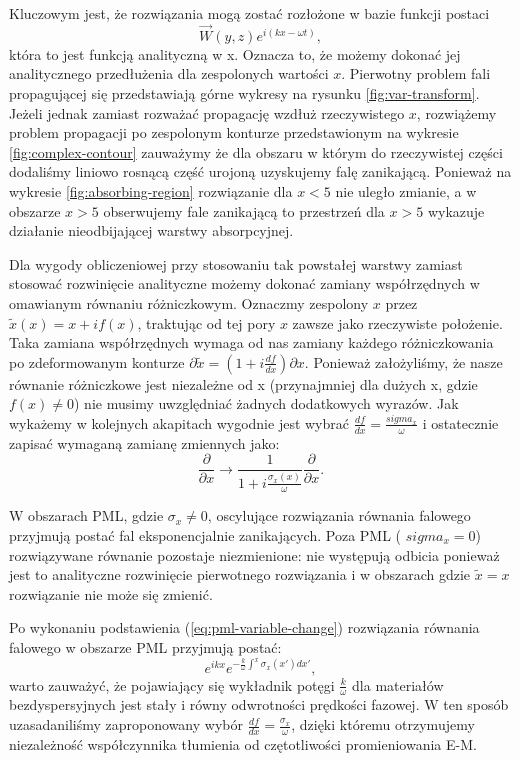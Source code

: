 Kluczowym jest, że rozwiązania mogą zostać rozłożone w bazie funkcji postaci
\begin{equation}
\vec{W}(y,z)e^{i(kx-\omega t)},
\end{equation}
która to jest funkcją analityczną w x. Oznacza to, że możemy dokonać jej analitycznego przedłużenia dla zespolonych wartości $x$. Pierwotny problem fali propagującej się przedstawiają górne wykresy na rysunku \ref{fig:var-transform}. Jeżeli jednak zamiast rozważać propagację wzdłuż rzeczywistego $x$, rozwiążemy problem propagacji po zespolonym konturze przedstawionym na wykresie \ref{fig:complex-contour} zauważymy że dla obszaru w którym do rzeczywistej części dodaliśmy liniowo rosnącą część urojoną uzyskujemy falę zanikającą. Ponieważ na wykresie \ref{fig:absorbing-region} rozwiązanie dla $x<5$ nie uległo zmianie, a w obszarze $x>5$ obserwujemy fale zanikającą to przestrzeń dla $x>5$ wykazuje działanie nieodbijającej warstwy absorpcyjnej.

Dla wygody obliczeniowej przy stosowaniu tak powstałej warstwy zamiast stosować rozwinięcie analityczne możemy dokonać zamiany współrzędnych w omawianym równaniu różniczkowym. Oznaczmy zespolony $x$ przez $\tilde{x}(x)=x+if(x)$, traktując od tej pory $x$ zawsze jako rzeczywiste położenie. Taka zamiana współrzędnych wymaga od nas zamiany każdego różniczkowania po zdeformowanym konturze $\partial \tilde{x} = (1+i\frac{df}{dx}) \partial x$. Ponieważ założyliśmy, że nasze równanie różniczkowe jest niezależne od x (przynajmniej dla dużych x, gdzie $f(x)\ne0$) nie musimy uwzględniać żadnych dodatkowych wyrazów. Jak wykażemy w kolejnych akapitach wygodnie jest wybrać $\frac{df}{dx}=\frac{sigma_x}{\omega}$ i ostatecznie zapisać wymaganą zamianę zmiennych jako:
\begin{equation}
	\frac{\partial}{\partial x} \to \frac{1} {1+i \frac{\sigma_x(x)}{\omega}} \frac{\partial}{\partial x}.
	\label{eq:pml-variable-change}
\end{equation}

W obszarach PML, gdzie $\sigma_x\ne0$, oscylujące rozwiązania równania falowego przyjmują postać fal eksponencjalnie zanikających. Poza PML ( $sigma_x=0$) rozwiązywane równanie pozostaje niezmienione: nie występują odbicia ponieważ jest to analityczne rozwinięcie pierwotnego rozwiązania i w obszarach gdzie $\tilde{x}=x$ rozwiązanie nie może się zmienić.

Po wykonaniu podstawienia (\ref{eq:pml-variable-change}) rozwiązania równania falowego w obszarze PML przyjmują postać:
\begin{equation}
e^{ikx}e^{-\frac{k}{\omega}\int^x \sigma_x(x')dx'},
\end{equation}
warto zauważyć, że pojawiający się wykładnik potęgi $\frac{k}{\omega}$ dla materiałów bezdyspersyjnych jest stały i równy odwrotności prędkości fazowej. W ten sposób uzasadaniliśmy zaproponowany wybór $\frac{df}{dx}=\frac{\sigma_x}{\omega}$, dzięki któremu otrzymujemy niezależność współczynnika tłumienia od czętotliwości promieniowania E-M. 

